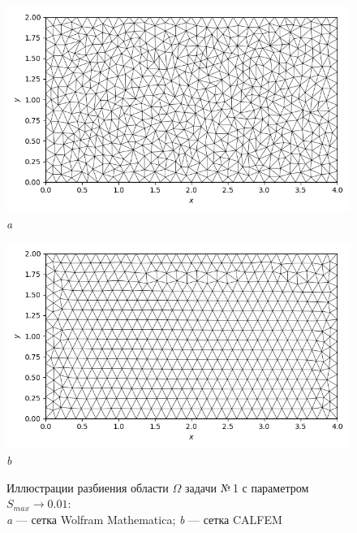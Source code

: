 \documentclass[12pt, a4paper]{article}
\begin{document}
			
			\begin{figure}[h]  
				\centering     
				\vspace{-2.0mm} 
				\begin{center} 
					{ 
						\begin{minipage}{0.47\textwidth} 
							\centering 
							\hspace*{-17.7mm}
							\includegraphics[width=1.2\columnwidth]{rect_dirichlet_only_001_net.png}\\ 
							\hspace*{-11mm}
							\textit{a} 
						\end{minipage}                                 
					} 
					{ 
						\begin{minipage}{0.47\textwidth} 
							\centering 
							\hspace*{-7.2mm}
							\includegraphics[width=1.2\columnwidth]{rect_dirichlet_only_001_calfem_net.png}\\
							\hspace*{7.2mm} 
							\textit{b} 
						\end{minipage}                                 
					} 				
				\end{center} 
				\vspace*{-0.0mm} 
				\caption{Иллюстрации разбиения области $\Omega$ задачи №\,1 с параметром $S_{max} \rightarrow 0.01$: \\
					\textit{a} --- сетка Wolfram Mathematica;
					\textit{b} --- сетка CALFEM
				} 
				\label{fig: comp_mesh_calfem_wolfram}
			\end{figure}
			
\end{document}
